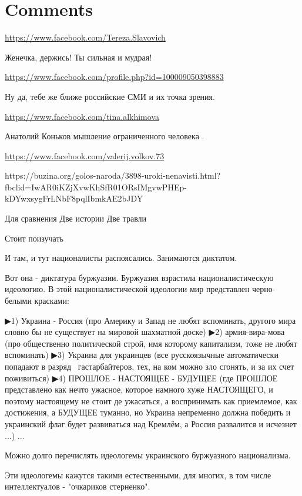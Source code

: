 \documentclass[a4paper,11pt]{extreport}
\begin{document}
\section{Comments}
\begin{itemize}
\url{https://www.facebook.com/Tereza.Slavovich}

Женечка, держись! Ты сильная и мудрая!

\url{https://www.facebook.com/profile.php?id=100009050398883}

Ну да, тебе же ближе российские СМИ и их точка зрения.

\begin{itemize}
\url{https://www.facebook.com/tina.alkhimova}

Анатолий Коньков мышление ограниченного человека .

\end{itemize}
\url{https://www.facebook.com/valerij.volkov.73}

https://buzina.org/golos-naroda/3898-uroki-nenavisti.html?fbclid=IwAR0iKZjXvwKhSfR01ORsIMgvwPHEp-kDYwxsygFrLNbF8pqlIbmkAE2bJDY

Для сравнения
Две истории
Две травли

Стоит поизучать

И там, и тут националисты распоясались.
Занимаются диктатом.

Вот она - диктатура буржуазии.
Буржуазия взрастила националистическую идеологию. В этой националистической идеологии мир представлен черно-белыми красками:

▶1) Украина - Россия (про Америку и Запад не любят вспоминать, другого мира словно бы не существует на мировой шахматной доске)
▶2) армия-вира-мова (про общественно политической строй, имя которому капитализм, тоже не любят вспоминать)
▶3) Украина для украинцев (все русскоязычные автоматически попадают в разряд ~гастарбайтеров, тех, на ком можно зло сгонять, и за их счет поживиться)
▶4) ПРОШЛОЕ - НАСТОЯЩЕЕ - БУДУЩЕЕ (где ПРОШЛОЕ представлено как нечто ужасное, которое намного хуже НАСТОЯЩЕГО, и поэтому настоящему не стоит де ужасаться, а воспринимать как приемлемое, как достижения, а БУДУЩЕЕ туманно, но Украина непременно должна победить и украинский флаг будет развиваться над Кремлём, а Россия развалится и исчезнет ...) ...

Можно долго перечислять идеологемы украинского буржуазного национализма.

Эти идеологемы кажутся такими естественными, для многих, в том числе интеллектуалов - "очкариков стерненко".


\end{itemize}
\end{document}
